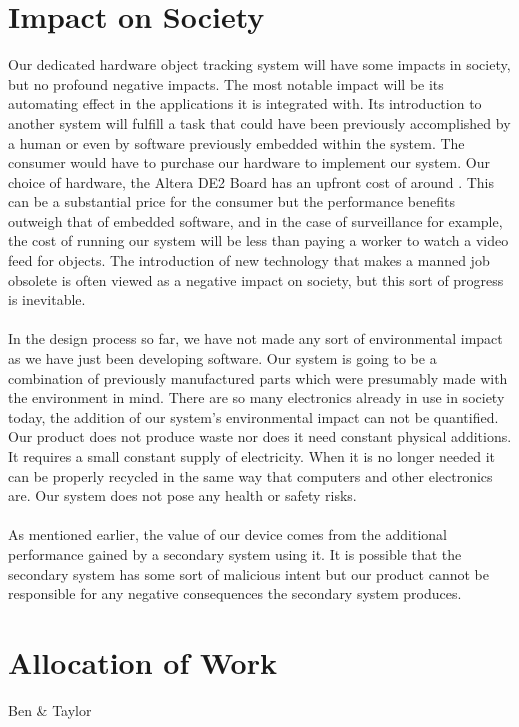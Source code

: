 \documentclass[12pt]{article} %
\begin{document}
\section{Impact on Society}
Our dedicated hardware object tracking system will have some impacts in society, but no profound negative impacts. The most notable impact will be its automating effect in the applications it is integrated with. Its introduction to another system will fulfill a task that could have been previously accomplished by a human or even by software previously embedded within the system. The consumer would have to purchase our hardware to implement our system. Our choice of hardware, the Altera DE2 Board has an upfront cost of around . This can be a substantial price for the consumer but the performance benefits outweigh that of embedded software, and in the case of surveillance for example, the cost of running our system will be less than paying a worker to watch a video feed for objects. The introduction of new technology that makes a manned job obsolete is often viewed as a negative impact on society, but this sort of progress is inevitable. \\\\
In the design process so far, we have not made any sort of environmental impact as we have just been developing software. Our system is going to be a combination of previously manufactured parts which were presumably made with the environment in mind. There are so many electronics already in use in society today, the addition of our system's environmental impact can not be quantified. Our product does not produce waste nor does it need constant physical additions. It requires a small constant supply of electricity. When it is no longer needed it can be properly recycled in the same way that computers and other electronics are. Our system does not pose any health or safety risks.\\\\
As mentioned earlier, the value of our device comes from the additional performance gained by a secondary system using it. It is possible that the secondary system has some sort of malicious intent but our product cannot be responsible for any negative consequences the secondary system produces. 
\section{Allocation of Work}
Ben \& Taylor
\end{document}
